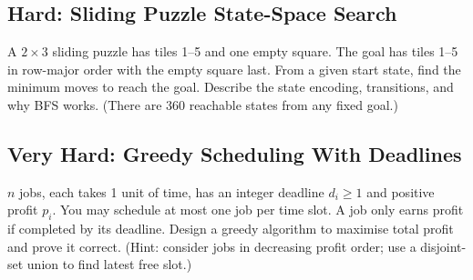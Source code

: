 \documentclass[12pt]{article}
\begin{document}
\subsection*{Hard: Sliding Puzzle State-Space Search}
A $2\times3$ sliding puzzle has tiles 1--5 and one empty square. The
goal has tiles 1--5 in row-major order with the empty square last.
From a given start state, find the minimum moves to reach the goal.
Describe the state encoding, transitions, and why BFS works. (There
are 360 reachable states from any fixed goal.)

\subsection*{Very Hard: Greedy Scheduling With Deadlines}
$n$ jobs, each takes 1 unit of time, has an integer deadline $d_i\ge1$
and positive profit $p_i$. You may schedule at most one job per time
slot. A job only earns profit if completed by its deadline. Design a greedy algorithm
to maximise total profit and prove it correct. (Hint: consider jobs
in decreasing profit order; use a disjoint-set union to find latest free slot.)
\end{document}

